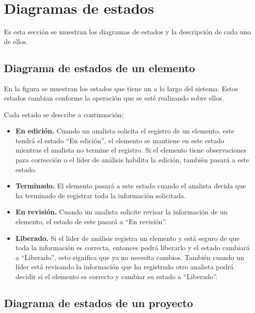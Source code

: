 \section{Diagramas de estados}
Es esta sección se muestran los diagramas de estados y la descripción de cada uno de ellos.\\

\subsection{Diagrama de estados de un elemento}

En la figura  se muestran los estados que tiene un  a lo largo 
del sistema. Estos estados cambian conforme la operación que se esté realizando sobre ellos.\\


Cada estado se describe a continuación:

\begin{itemize}
 \item {\bf En edición.} Cuando un analista solicita el registro de un elemento, este tendrá el estado ``En edición'', el elemento se mantiene en 
 este estado mientras el analista no termine el registro. Si el elemento tiene observaciones para corrección o el líder de análisis habilita la edición,
 también pasará a este estado.
 \item {\bf Terminado.} El elemento pasará a este estado cuando el analista decida que ha terminado de registrar toda la información solicitada.
 \item {\bf En revisión.} Cuando un analista solicite revisar la información de un elemento, el estado de este pasará a ``En revisión''.
 \item {\bf Liberado.} Si el líder de análisis registra un elemento y está seguro de que toda la información es correcta, entonces podrá liberarlo y el estado cambiará
 a ``Liberado'', esto significa que ya no necesita cambios. También cuando un líder está revisando la información que ha registrado otro analista
 podrá decidir si el elemento es correcto y cambiar su estado a ``Liberado''.
\end{itemize}

\subsection{Diagrama de estados de un proyecto}

